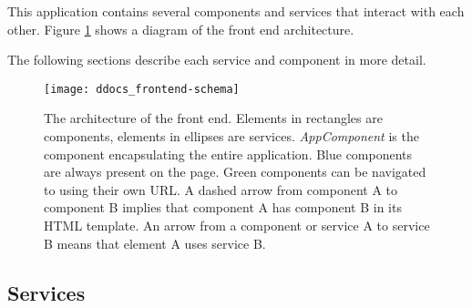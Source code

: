 This application contains several components and services that interact with each other. Figure \ref{fig:frontend-schema} shows a diagram of the front end architecture.

The following sections describe each service and component in more detail.

\begin{figure}[!h]
\centering
\texttt{[image: ddocs\_frontend-schema]}
\caption{The architecture of the front end. Elements in rectangles are components, elements in ellipses are services. \emph{AppComponent} is the component encapsulating
the entire application. Blue components are always present on the page. Green components can be navigated to using their own URL. A dashed arrow from component A
to component B implies that component A has component B in its HTML template. An arrow from a component or service A to service B means that element A uses service B.}
\label{fig:frontend-schema}
\end{figure}

\subsection{Services}


